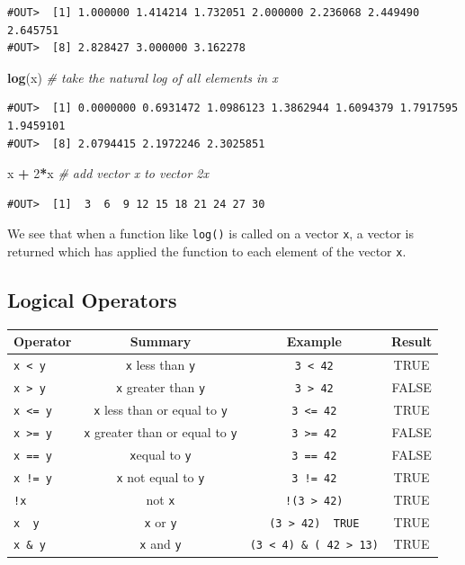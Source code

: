 \documentclass[]{book}
\newenvironment{Shaded}{\begin{snugshade}}{\end{snugshade}}
\newcommand{\CommentTok}[1]{\textcolor[rgb]{0.56,0.35,0.01}{\textit{#1}}}
\newcommand{\DecValTok}[1]{\textcolor[rgb]{0.00,0.00,0.81}{#1}}
\newcommand{\KeywordTok}[1]{\textcolor[rgb]{0.13,0.29,0.53}{\textbf{#1}}}
\newcommand{\NormalTok}[1]{#1}
\newcommand{\OperatorTok}[1]{\textcolor[rgb]{0.81,0.36,0.00}{\textbf{#1}}}
\newcommand{\StringTok}[1]{\textcolor[rgb]{0.31,0.60,0.02}{#1}}
\begin{document}
\begin{verbatim}
#OUT>  [1] 1.000000 1.414214 1.732051 2.000000 2.236068 2.449490 2.645751
#OUT>  [8] 2.828427 3.000000 3.162278
\end{verbatim}

\begin{Shaded}
\begin{Highlighting}[]
\KeywordTok{log}\NormalTok{(x)    }\CommentTok{# take the natural log of all elements in x}
\end{Highlighting}
\end{Shaded}

\begin{verbatim}
#OUT>  [1] 0.0000000 0.6931472 1.0986123 1.3862944 1.6094379 1.7917595 1.9459101
#OUT>  [8] 2.0794415 2.1972246 2.3025851
\end{verbatim}

\begin{Shaded}
\begin{Highlighting}[]
\NormalTok{x }\OperatorTok{+}\StringTok{ }\DecValTok{2}\OperatorTok{*}\NormalTok{x   }\CommentTok{# add vector x to vector 2x}
\end{Highlighting}
\end{Shaded}

\begin{verbatim}
#OUT>  [1]  3  6  9 12 15 18 21 24 27 30
\end{verbatim}

We see that when a function like \texttt{log()} is called on a vector \texttt{x}, a vector is returned which has applied the function to each element of the vector \texttt{x}.

\hypertarget{logical-operators}{%
\subsection{Logical Operators}\label{logical-operators}}

\begin{longtable}[]{@{}lccc@{}}
\toprule
Operator & Summary & Example & Result\tabularnewline
\midrule
\endhead
\texttt{x\ \textless{}\ y} & \texttt{x} less than \texttt{y} & \texttt{3\ \textless{}\ 42} & TRUE\tabularnewline
\texttt{x\ \textgreater{}\ y} & \texttt{x} greater than \texttt{y} & \texttt{3\ \textgreater{}\ 42} & FALSE\tabularnewline
\texttt{x\ \textless{}=\ y} & \texttt{x} less than or equal to \texttt{y} & \texttt{3\ \textless{}=\ 42} & TRUE\tabularnewline
\texttt{x\ \textgreater{}=\ y} & \texttt{x} greater than or equal to \texttt{y} & \texttt{3\ \textgreater{}=\ 42} & FALSE\tabularnewline
\texttt{x\ ==\ y} & \texttt{x}equal to \texttt{y} & \texttt{3\ ==\ 42} & FALSE\tabularnewline
\texttt{x\ !=\ y} & \texttt{x} not equal to \texttt{y} & \texttt{3\ !=\ 42} & TRUE\tabularnewline
\texttt{!x} & not \texttt{x} & \texttt{!(3\ \textgreater{}\ 42)} & TRUE\tabularnewline
\texttt{x\ \textbar{}\ y} & \texttt{x} or \texttt{y} & \texttt{(3\ \textgreater{}\ 42)\ \textbar{}\ TRUE} & TRUE\tabularnewline
\texttt{x\ \&\ y} & \texttt{x} and \texttt{y} & \texttt{(3\ \textless{}\ 4)\ \&\ (\ 42\ \textgreater{}\ 13)} & TRUE\tabularnewline
\bottomrule
\end{longtable}
\end{document}

